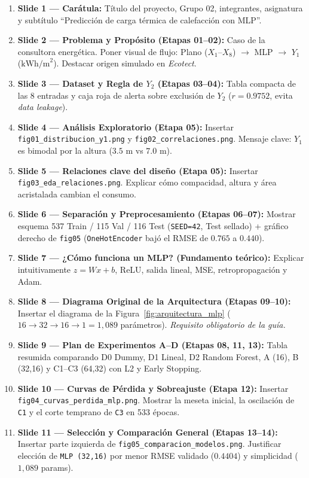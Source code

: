 \documentclass[11pt,a4paper]{article}
\begin{document}
\begin{enumerate}[leftmargin=1.4em, itemsep=6pt]
    \item \textbf{Slide 1 — Carátula:} Título del proyecto, Grupo 02, integrantes, asignatura y subtítulo ``Predicción de carga térmica de calefacción con MLP''.
    \item \textbf{Slide 2 — Problema y Propósito (Etapas 01–02):} Caso de la consultora energética. Poner visual de flujo: Plano ($X_1$--$X_8$) $\rightarrow$ MLP $\rightarrow$ $Y_1$ ($\text{kWh/m}^2$). Destacar origen simulado en \textit{Ecotect}.
    \item \textbf{Slide 3 — Dataset y Regla de $Y_2$ (Etapas 03–04):} Tabla compacta de las 8 entradas y caja roja de alerta sobre exclusión de $Y_2$ ($r = 0.9752$, evita \textit{data leakage}).
    \item \textbf{Slide 4 — Análisis Exploratorio (Etapa 05):} Insertar \texttt{fig01\_distribucion\_y1.png} y \texttt{fig02\_correlaciones.png}. Mensaje clave: $Y_1$ es bimodal por la altura ($3.5\text{ m}$ vs $7.0\text{ m}$).
    \item \textbf{Slide 5 — Relaciones clave del diseño (Etapa 05):} Insertar \texttt{fig03\_eda\_relaciones.png}. Explicar cómo compacidad, altura y área acristalada cambian el consumo.
    \item \textbf{Slide 6 — Separación y Preprocesamiento (Etapas 06–07):} Mostrar esquema 537 Train / 115 Val / 116 Test (\texttt{SEED=42}, Test sellado) + gráfico derecho de \texttt{fig05} (\texttt{OneHotEncoder} bajó el RMSE de $0.765$ a $0.440$).
    \item \textbf{Slide 7 — ¿Cómo funciona un MLP? (Fundamento teórico):} Explicar intuitivamente $z = Wx + b$, ReLU, salida lineal, MSE, retropropagación y Adam.
    \item \textbf{Slide 8 — Diagrama Original de la Arquitectura (Etapas 09–10):} Insertar el diagrama de la Figura~\ref{fig:arquitectura_mlp} ($16 \to 32 \to 16 \to 1 = 1{,}089$ parámetros). \textit{Requisito obligatorio de la guía.}
    \item \textbf{Slide 9 — Plan de Experimentos A--D (Etapas 08, 11, 13):} Tabla resumida comparando D0 Dummy, D1 Lineal, D2 Random Forest, A (16), B (32,16) y C1–C3 (64,32) con L2 y Early Stopping.
    \item \textbf{Slide 10 — Curvas de Pérdida y Sobreajuste (Etapa 12):} Insertar \texttt{fig04\_curvas\_perdida\_mlp.png}. Mostrar la meseta inicial, la oscilación de \texttt{C1} y el corte temprano de \texttt{C3} en 533 épocas.
    \item \textbf{Slide 11 — Selección y Comparación General (Etapas 13–14):} Insertar parte izquierda de \texttt{fig05\_comparacion\_modelos.png}. Justificar elección de \texttt{MLP (32,16)} por menor RMSE validado ($0.4404$) y simplicidad ($1{,}089$ params).

\end{enumerate}
\end{document}
